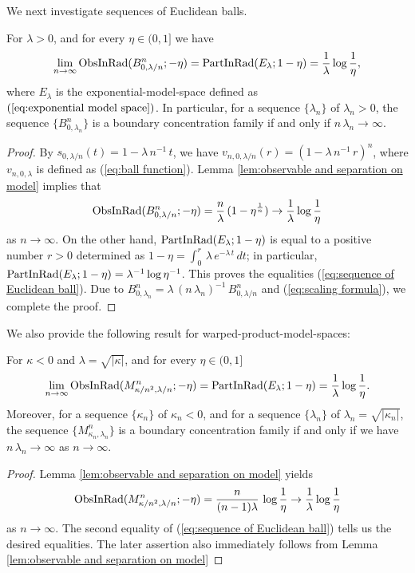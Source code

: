 We next investigate sequences of Euclidean balls.
\begin{thm}\label{thm:sequence of Euclidean ball}
For $\lambda>0$,
and for every $\eta \in (0,1]$
we have
\begin{equation}\label{eq:sequence of Euclidean ball}
\lim_{n\to \infty}\operatorname{ObsInRad}(B^{n}_{0,\lambda/n};-\eta)= \operatorname{PartInRad}(E_{\lambda};1-\eta)=\frac{1}{\lambda}\log \frac{1}{\eta},
\end{equation}
where $E_{\lambda}$ is the exponential-model-space defined as $(\ref{eq:exponential model space})$.
In particular,
for a sequence $\{\lambda_{n}\}$ of $\lambda_{n}>0$,
the sequence $\{B^{n}_{0,\lambda_{n}}\}$ is a boundary concentration family if and only if $n\,\lambda_{n}\to \infty$.
\end{thm}
\begin{proof}
By $s_{0,\lambda/n}(t)=1-\lambda\,n^{-1}\,t$,
we have $v_{n,0,\lambda/n}(r)=(1-\lambda\,n^{-1}\,r)^{n}$,
where $v_{n,0,\lambda}$ is defined as (\ref{eq:ball function}).
Lemma \ref{lem:observable and separation on model} implies that
\begin{equation*}
\operatorname{ObsInRad}(B^{n}_{0,\lambda/n};-\eta)=\frac{n}{\lambda}\,(1-\eta^{\frac{1}{n}})\to \frac{1}{\lambda}\log \frac{1}{\eta}
\end{equation*}
as $n\to \infty$.
On the other hand,
$\operatorname{PartInRad}(E_{\lambda};1-\eta)$ is equal to a positive number $r>0$ determined as $1-\eta=\int^{r}_{0}\,\lambda\,e^{-\lambda\,t}\,dt$;
in particular,
$\operatorname{PartInRad}(E_{\lambda};1-\eta)=\lambda^{-1} \log \eta^{-1}$.
This proves the equalities (\ref{eq:sequence of Euclidean ball}).
Due to $B^{n}_{0,\lambda_{n}}=\lambda\,(n\,\lambda_{n})^{-1} \,B^{n}_{0,\lambda/n}$ and (\ref{eq:scaling formula}),
we complete the proof.
\end{proof}

We also provide the following result for warped-product-model-spaces:
\begin{thm}\label{thm:warped product model Levy family}
For $\kappa<0$ and $\lambda=\sqrt{\vert \kappa \vert}$,
and for every $\eta \in (0,1]$
\begin{equation*}\label{eq:warped product Levy family}
\lim_{n\to \infty}\operatorname{ObsInRad}(M^{n}_{\kappa/n^{2},\lambda/n};-\eta)= \operatorname{PartInRad}(E_{\lambda};1-\eta)=\frac{1}{\lambda}\log \frac{1}{\eta}.
\end{equation*}
Moreover,
for a sequence $\{\kappa_{n}\}$ of $\kappa_{n}<0$,
and for a sequence $\{\lambda_{n}\}$ of $\lambda_{n}=\sqrt{\vert \kappa_{n} \vert}$,
the sequence $\{M^{n}_{\kappa_{n},\lambda_{n}}\}$ is a boundary concentration family if and only if we have $n\,\lambda_{n}\to \infty$ as $n\to \infty$.
\end{thm}
\begin{proof}
Lemma \ref{lem:observable and separation on model} yields
\begin{equation*}
\operatorname{ObsInRad}(M^{n}_{\kappa/n^{2},\lambda/n};-\eta)=\frac{n}{(n-1)\lambda}\,\log \frac{1}{\eta} \to \frac{1}{\lambda}\log \frac{1}{\eta}
\end{equation*}
as $n\to \infty$.
The second equality of (\ref{eq:sequence of Euclidean ball}) tells us the desired equalities.
The later assertion also immediately follows from Lemma \ref{lem:observable and separation on model}
\end{proof}

